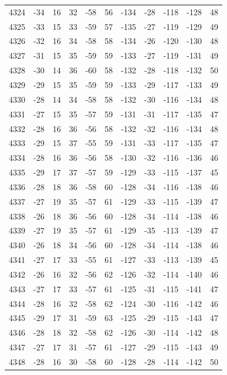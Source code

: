 \begin{table}[H]
\begin{tabular}{lllllllllll}
4324 & -34 & 16 & 32 & -58 & 56 & -134 & -28 & -118 & -128 & 48 \\
4325 & -33 & 15 & 33 & -59 & 57 & -135 & -27 & -119 & -129 & 49 \\
4326 & -32 & 16 & 34 & -58 & 58 & -134 & -26 & -120 & -130 & 48 \\
4327 & -31 & 15 & 35 & -59 & 59 & -133 & -27 & -119 & -131 & 49 \\
4328 & -30 & 14 & 36 & -60 & 58 & -132 & -28 & -118 & -132 & 50 \\
4329 & -29 & 15 & 35 & -59 & 59 & -133 & -29 & -117 & -133 & 49 \\
4330 & -28 & 14 & 34 & -58 & 58 & -132 & -30 & -116 & -134 & 48 \\
4331 & -27 & 15 & 35 & -57 & 59 & -131 & -31 & -117 & -135 & 47 \\
4332 & -28 & 16 & 36 & -56 & 58 & -132 & -32 & -116 & -134 & 48 \\
4333 & -29 & 15 & 37 & -55 & 59 & -131 & -33 & -117 & -135 & 47 \\
4334 & -28 & 16 & 36 & -56 & 58 & -130 & -32 & -116 & -136 & 46 \\
4335 & -29 & 17 & 37 & -57 & 59 & -129 & -33 & -115 & -137 & 45 \\
4336 & -28 & 18 & 36 & -58 & 60 & -128 & -34 & -116 & -138 & 46 \\
4337 & -27 & 19 & 35 & -57 & 61 & -129 & -33 & -115 & -139 & 47 \\
4338 & -26 & 18 & 36 & -56 & 60 & -128 & -34 & -114 & -138 & 46 \\
4339 & -27 & 19 & 35 & -57 & 61 & -129 & -35 & -113 & -139 & 47 \\
4340 & -26 & 18 & 34 & -56 & 60 & -128 & -34 & -114 & -138 & 46 \\
4341 & -27 & 17 & 33 & -55 & 61 & -127 & -33 & -113 & -139 & 45 \\
4342 & -26 & 16 & 32 & -56 & 62 & -126 & -32 & -114 & -140 & 46 \\
4343 & -27 & 17 & 33 & -57 & 61 & -125 & -31 & -115 & -141 & 47 \\
4344 & -28 & 16 & 32 & -58 & 62 & -124 & -30 & -116 & -142 & 46 \\
4345 & -29 & 17 & 31 & -59 & 63 & -125 & -29 & -115 & -143 & 47 \\
4346 & -28 & 18 & 32 & -58 & 62 & -126 & -30 & -114 & -142 & 48 \\
4347 & -27 & 17 & 31 & -57 & 61 & -127 & -29 & -115 & -143 & 49 \\
4348 & -28 & 16 & 30 & -58 & 60 & -128 & -28 & -114 & -142 & 50 \\

\end{tabular}
\end{table}
